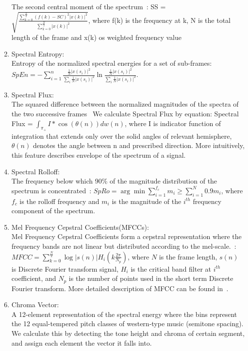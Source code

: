 \begin{enumerate}
	The second central moment of the spectrum~\cite{b3}:  SS = $\sqrt{\frac{\sum_{k = 0}^{\frac{N}{2}} (f(k)-SC)^2 |x(k)|^2}{\sum_{k = 0}^{\frac{N}{2}} |x(k)|^2 }}$, where f(k) is the frequency at k, N is the total length of the frame and x(k) os weighted frequency value \\
	\item Spectral Entropy:\\
	Entropy of the normalized spectral energies for a set of sub-frames\cite{b3}: $SpEn = -\sum_{i = 1}^{n} \frac{\frac{1}{N} |x(s_i)|^2}{\sum_{i}^{}\frac{1}{N} |x(s_i)|^2} \ln\frac{\frac{1}{N} |x(s_i)|^2}{\sum_{i}^{}\frac{1}{N} |x(s_i)|^2}$.
	\item Spectral Flux:\\
	The squared difference between the normalized magnitudes of the spectra of the two successive frames~\cite{b3} We calculate Spectral Flux by equation: Spectral Flux = $\int_{\pi_+}^{} I * \cos(\theta(n)) dw(n)$, where I is indicator function of integration that extends only over the solid angles of relevant hemisphere, $\theta(n)$ denotes the angle between n and prescribed direction. More intuitively, this feature describes envelope of the spectrum of a signal.
	\item Spectral Rolloff:\\
	The frequency below which 90\% of the magnitude distribution of the spectrum is concentrated~\cite{b3}: $SpRo = \arg \min \sum_{i = 1}^{f_c} m_i \geq \sum_{i = 1}^{N}0.9 m_i$, where $f_c$ is the rolloff frequency and $m_i$ is the magnitude of the $i^{th}$ frequency component of the spectrum. 
	\item Mel Frequency Cepstral Coefficients(MFCCs):\\
	Mel Frequency Cepstral Coefficients form a cepstral representation where the frequency bands are not linear but distributed according to the mel-scale.~\cite{b4}:  $MFCC = \sum_{k = 0}^{\frac{N}{2}}\log |s(n)| H_i(k\frac{2\pi}{N_p})$, where $N$ is the frame length, $s(n)$ is Discrete Fourier transform signal, $H_i$ is the critical band filter at $i^{th}$ coefficient, and $N_p$ is the number of points used in the short term Discrete Fourier transform. More detailed description of MFCC can be found in~\cite{b9}.
	\item Chroma Vector:\\
	A 12-element representation of the spectral energy where the bins represent the 12 equal-tempered pitch classes of western-type music (semitone spacing).\cite{b5} We calculate this by detecting the tone height and chroma of certain segment, and assign each element the vector it falls into.

\end{enumerate}
